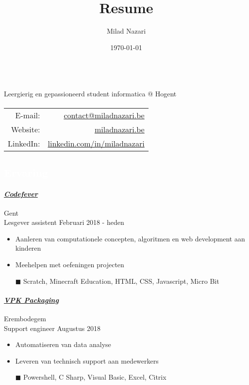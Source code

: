 \documentclass[a4paper, twoside]{article}
\title{Resume}
\author{ Milad Nazari }
\date{\today}
\begin{document}
\begin{multicols}{2}
\\
\noindent Leergierig en gepassioneerd student informatica @ Hogent
\paragraph{}
{\small
\hfill
\begin{tabular}{rr}
\textcolor{blueDark}{E-mail:} & \href{ mailto:contact@miladnazari.be }{ contact@miladnazari.be } \\
\textcolor{blueDark}{Website:} & \href{ https://miladnazari.be }{ miladnazari.be } \\
\textcolor{blueDark}{LinkedIn}: & \href{ https://linkedin.com/in/miladnazari }{ linkedin.com/in/miladnazari }
\end{tabular}
}
\end{multicols}
\begin{mdframed}
\section*{\textcolor{white}{ Ervaring }}
\end{mdframed}
\paragraph{\textbf{\textit{\href{https://codefever.be }{\textcolor{blueDark}{ Codefever }}}}} \hfill\small Gent \\
Lesgever assistent \hfill\small
Februari 2018
- heden
\begin{itemize}
\itemsep-0.2em
\item Aanleren van computationele concepten, algoritmen en web development aan kinderen
\item Meehelpen met oefeningen projecten
\item[\color{orange}$\blacksquare$] Scratch, Minecraft Education, HTML, CSS, Javascript, Micro Bit
\end{itemize}
\paragraph{\textbf{\textit{\href{https://vpkgroup.com }{\textcolor{blueDark}{ VPK Packaging }}}}} \hfill\small Erembodegem \\
Support engineer \hfill\small
Augustus 2018
\begin{itemize}
\itemsep-0.2em
\item Automatiseren van data analyse
\item Leveren van technisch support aan medewerkers
\item[\color{orange}$\blacksquare$] Powershell, C Sharp, Visual Basic, Excel, Citrix
\end{itemize}
\end{document}
